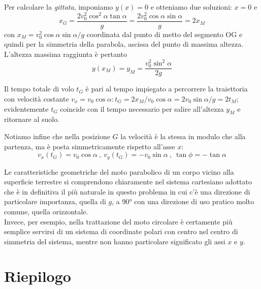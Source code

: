 \documentclass[class=book, crop=false, oneside, 12pt]{standalone}
\begin{document}
Per calcolare la \emph{gittata}, imponiamo \(y(x) = 0\) e otteniamo due soluzioni: \(x=0\) e
\begin{equation}
  x_{G}=\frac{2 v_{0}^{2} \cos ^{2} \alpha \tan \alpha}{g}=\frac{2 v_{0}^{2} \cos \alpha \sin \alpha}{g}=2 x_{M}
\end{equation}
con \(x_M = v_0^2 \cos \alpha \sin \alpha / g\) coordinata dal punto di metto del segmento OG e quindi per la simmetria della parabola, ascissa del punto di massima altezza.
L'altezza massima raggiunta è pertanto
\begin{equation}
  y(x_M) = y_M = \frac{v_0^2 \sin^2 \alpha}{2g}
\end{equation}

Il tempo totale di volo \(t_G\) è pari al tempo impiegato a percorrere la traiettoria con velocità costante \(v_x = v_0 \cos \alpha : t_G = 2 x_M /v_0 \cos \alpha = 2v_0 \sin \alpha / g = 2 t_M\);
evidentemente \(t_G\) coincide con il tempo necessario per salire all'altezza \(y_M\) e ritornare al suolo.

Notiamo infine che nella posizione \(G\) la velocità è la stessa in modulo che alla partenza, ma è posta simmetricamente rispetto all'asse \(x\):
\begin{equation}
  v_x(t_G) = v_0 \cos \alpha \ , \ v_y (t_G) = -v_0 \sin \alpha \ , \ \tan \phi = - \tan \alpha
\end{equation}

Le caratteristiche geometriche del moto parabolico di un corpo vicino alla superficie terrestre si comprendono chiaramente nel sistema cartesiano adottato che è in definitiva il più naturale in questo problema in cui c'è una direzione di particolare importanza,
quella di \(g\), a 90° con una direzione di uso pratico molto comune, quella orizzontale.\\
Invece, per esempio, nella trattazione del moto circolare è certamente più semplice servirsi di un sistema di coordinate polari con centro nel centro di simmetria del sistema, mentre non hanno particolare significato gli assi \(x\) e \(y\).

\section{Riepilogo}
\end{document}
